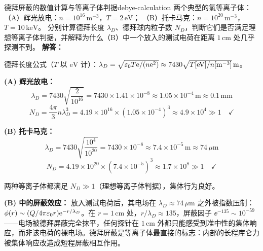 \begin{example}{德拜屏蔽的数值计算与等离子体判据}{debye-calculation}
两个典型的氢等离子体：
（A）辉光放电：$n=10^{16}\,\mathrm{m^{-3}}$，$T=2\,\mathrm{eV}$；
（B）托卡马克：$n=10^{20}\,\mathrm{m^{-3}}$，$T=10\,\mathrm{keV}$。
分别计算德拜长度 $\lambda_D$、德拜球内粒子数 $N_D$，判断它们是否满足理想等离子体判据，并解释为什么（B）中一个放入的测试电荷在距离 $1\,\mathrm{cm}$ 处几乎探测不到。
\tcblower
\textbf{解答：}

德拜长度公式（$T$ 以 $\mathrm{eV}$ 计）：$\lambda_D = \sqrt{\varepsilon_0 T\mathrm{e}/(n\mathrm{e}^2)} \approx 7430\sqrt{T[\mathrm{eV}]/n[\mathrm{m^{-3}}]}\,\mathrm{m}$。

\textbf{(A) 辉光放电：}
\[
\lambda_D = 7430\sqrt{\frac{2}{10^{16}}} = 7430\times1.41\times10^{-8} \approx 1.05\times10^{-4}\,\mathrm{m} \approx 0.1\,\mathrm{mm}
\]
\[
N_D = \frac{4\pi}{3}n\lambda_D^3 = 4.19\times10^{16}\times(1.05\times10^{-4})^3 \approx 4.9\times10^4 \gg 1 \quad\checkmark
\]

\textbf{(B) 托卡马克：}
\[
\lambda_D = 7430\sqrt{\frac{10^4}{10^{20}}} = 7430\times10^{-8} \approx 7.4\times10^{-5}\,\mathrm{m} \approx 74\,\mu\mathrm{m}
\]
\[
N_D = 4.19\times10^{20}\times(7.4\times10^{-5})^3 \approx 1.7\times10^8 \gg 1 \quad\checkmark
\]

两种等离子体都满足 $N_D\gg1$（理想等离子体判据），集体行为良好。

\textbf{(B) 中的屏蔽效应：} 放入测试电荷后，其电场在 $\lambda_D\approx74\,\mu\mathrm{m}$ 之外被指数压制：$\phi(r)\sim (Q/4\pi\varepsilon_0 r)\mathrm{e}^{-r/\lambda_D}$。在 $r=1\,\mathrm{cm}$ 处，$r/\lambda_D \approx 135$，屏蔽因子 $\ee^{-135}\sim10^{-59}$——电场被德拜屏蔽完全抹平，任何探针在 $1\,\mathrm{cm}$ 外都只能感受到准中性的集体响应，而非该电荷的裸电场。德拜屏蔽是等离子体最直接的标志：内部的长程库仑力被集体响应改造成短程屏蔽相互作用。
\end{example}

